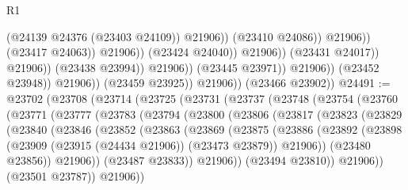 \begin{lexlean}{R1}
\begin{coremodule}
                                                          (@24139 @24376 (@23403 @24109))
                                                          @21906))
                                                      (@23410 @24086))
                                                    @21906))
                                                (@23417 @24063))
                                              @21906))
                                          (@23424 @24040))
                                        @21906))
                                    (@23431 @24017))
                                  @21906))
                              (@23438 @23994))
                            @21906))
                        (@23445 @23971))
                      @21906))
                  (@23452 @23948))
                @21906))
            (@23459 @23925))
          @21906))
      (@23466 @23902))
@24491 := @23702
    (@23708
      (@23714
        (@23725
          (@23731
            (@23737
              (@23748
                (@23754
                  (@23760
                    (@23771
                      (@23777
                        (@23783
                          (@23794
                            (@23800
                              (@23806
                                (@23817
                                  (@23823
                                    (@23829
                                      (@23840
                                        (@23846
                                          (@23852
                                            (@23863
                                              (@23869
                                                (@23875
                                                  (@23886
                                                    (@23892
                                                      (@23898
                                                        (@23909
                                                          (@23915 (@24434 @21906))
                                                          (@23473 @23879))
                                                        @21906))
                                                    (@23480 @23856))
                                                  @21906))
                                              (@23487 @23833))
                                            @21906))
                                        (@23494 @23810))
                                      @21906))
                                  (@23501 @23787))
                                @21906))

\end{coremodule}
\end{lexlean}
